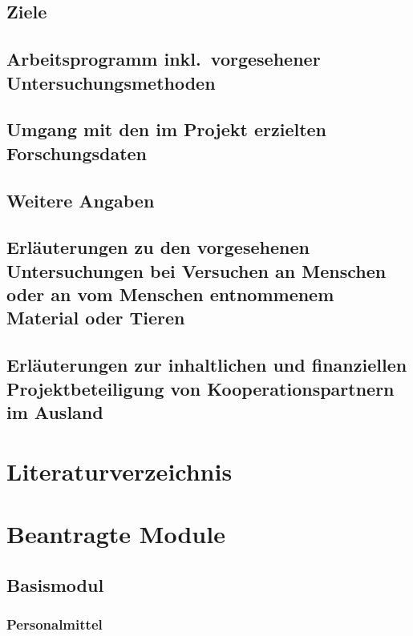 \documentclass{scrartcl}
\begin{document}
\subsection{Ziele}

\subsection{Arbeitsprogramm inkl.\ vorgesehener Untersuchungsmethoden}

\subsection{Umgang mit den im Projekt erzielten Forschungsdaten}

\subsection{Weitere Angaben}

\subsection{Erläuterungen zu den vorgesehenen Untersuchungen bei Versuchen an Menschen oder an vom Menschen entnommenem Material oder Tieren}

\subsection{Erläuterungen zur inhaltlichen und finanziellen Projektbeteiligung von Kooperationspartnern im Ausland}

\section{Literaturverzeichnis}

\printbibliography[notcategory=reviewed, notcategory=nonreviewed, notcategory=patents_pending, notcategory=patents, heading=none]


\section{Beantragte Module}

\subsection{Basismodul}

\subsubsection{Personalmittel}
\begin{funds}[Personalmittel]


\end{funds}
\end{document}
